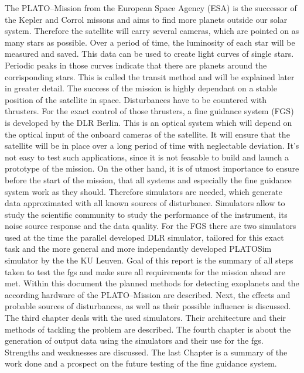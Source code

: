 The PLATO--Mission from the European Space Agency (ESA) is the successor of the Kepler and Corrol missons and aims to find more planets outside our solar system. Therefore the satellite will carry several cameras, which are pointed on as many stars as possible. Over a period of time, the luminosity of each star will be measured and saved. This data can be used to create light curves of single stars. Periodic peaks in those curves indicate that there are planets around the corrisponding stars. This is called the transit method and will be explained later in greater detail. 
\newline 
The success of the mission is highly dependant on a stable position of the satellite in space. Disturbances have to be countered with thrusters. For the exact control of those thrusters, a fine guidance system (FGS) is developed by the DLR Berlin. This is an optical system which will depend on the optical input of the onboard cameras of the satellite. It will ensure that the satellite will be in place over a long period of time with neglectable deviation. 
\newline 
It's not easy to test such applications, since it is not feasable to build and launch a prototype of the mission. On the other hand, it is of utmost importance to ensure before the start of the mission, that all systems and especially the fine guidance system work as they should. Therefore simulators are needed, which generate data approximated with all known sources of disturbance. Simulators allow to study the scientific community to study the performance of the instrument, its noise source response and the data quality. For the FGS there are two simulators used at the time the parallel developed DLR simulator, tailored for this exact task and the more general and more independantly developed PLATOSim simulator by the the KU Leuven.
\newline
Goal of this report is the summary of all steps taken to test the fgs and make sure all requirements for the mission ahead are met. Within this document the planned methods for detecting exoplanets and the according hardware of the PLATO--Mission are described. Next, the effects and probable sources of disturbances, as well as their possible influence is discussed. The third chapter deals with the used simulators. Their architecture and their methods of tackling the problem are described. The fourth chapter is about the generation of output data using the simulators and their use for the fgs. Strengths and weaknesses are discussed. The last Chapter is a summary of the work done and a prospect on the future testing of the fine guidance system.